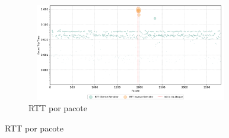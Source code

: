 \begin{apendicesenv}
\begin{figure}[htbp!]
\begin{subfigure}[t]{0.5\textwidth}
    \end{subfigure}%
    ~
    \begin{subfigure}[t]{0.5\textwidth}
        \centering
        \caption{RTT por pacote}
        \includegraphics[width=1\textwidth, height=120pt]{USPSC-img/output/cropped/0-dos_certificate_inf_chain_loop-rttp.png}
    \end{subfigure}%
\end{figure}


\end{apendicesenv}

